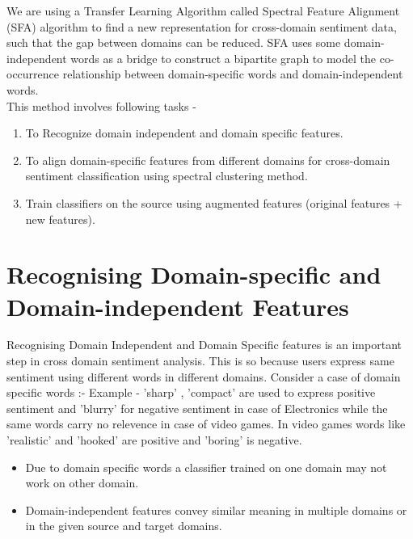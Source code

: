 \documentclass{report}
\begin{document}
We are using a Transfer Learning Algorithm called Spectral Feature Alignment (SFA) algorithm to find a new representation for cross-domain sentiment data, such that the gap between domains can be reduced. SFA uses some domain-independent words as a bridge to construct a bipartite graph to model the co-occurrence relationship between domain-specific words and domain-independent words.\\

This method involves following tasks -
\begin{enumerate}[label=\arabic*)]
\item To Recognize domain independent and domain specific features.
\item To align domain-specific features from different domains for cross-domain sentiment classification using spectral clustering method.
\item Train classifiers on the source using augmented features (original features + new features).
\end{enumerate}


\section{Recognising Domain-specific and Domain-independent Features}

Recognising Domain Independent and Domain Specific features is an important step in cross domain sentiment analysis. This is so because users express same sentiment using different words in different domains.
Consider a case of domain specific words  :-
Example - 'sharp' , 'compact' are used to express positive sentiment and 'blurry' for negative sentiment in case of Electronics while the same words carry no relevence in case of video games. In video games words like 'realistic' and 'hooked' are positive and 'boring' is negative.\\
\begin{itemize}
\item Due to domain specific words a classifier trained on one domain may not work on other domain.
\item Domain-independent features convey similar meaning in multiple domains or in the given source and target domains.\\
\end{itemize}
\end{document}
